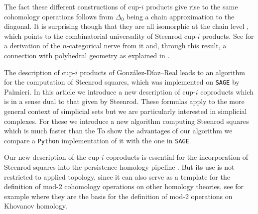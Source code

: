 The fact these different constructions of cup-$i$ products give rise to the same cohomology operations follows from $\Delta_0$ being a chain approximation to the diagonal.
It is surprising though that they are all isomorphic at the chain level \cite{medina2018axiomatic}, which points to the combinatorial universality of Steenrod cup-$i$ products.
See \cite{medina2020globular} for a derivation of the $n$-categorical nerve from it and, through this result, a connection with polyhedral geometry as explained in \cite{bibid}.

The description of cup-$i$ products of Gonz\'alez-D\'iaz--Real leads to an algorithm for the computation of Steenrod squares, which was implemented on \verb|SAGE| by Palmieri.
In this article we introduce a new description of cup-$i$ coproducts which is in a sense dual to that given by Steenrod.
These formulas apply to the more general context of simplicial sets but we are particularly interested in simplicial complexes.
For these we introduce a new algorithm computing Steenrod squares which is much faster than the 
To show the advantages of our algorithm we compare a \verb|Python| implementation of it with the one in \verb|SAGE|. 

Our new description of the cup-$i$ coproducts is essential for the incorporation of Steenrod squares into the persistence homology pipeline \cite{medina2018persistence}.
But its use is not restricted to applied topology, since it can also serve as a template for the definition of mod-2 cohomology operations on other homology theories, see for example \cite{bibid} where they are the basis for the definition of mod-2 operations on Khovanov homology.